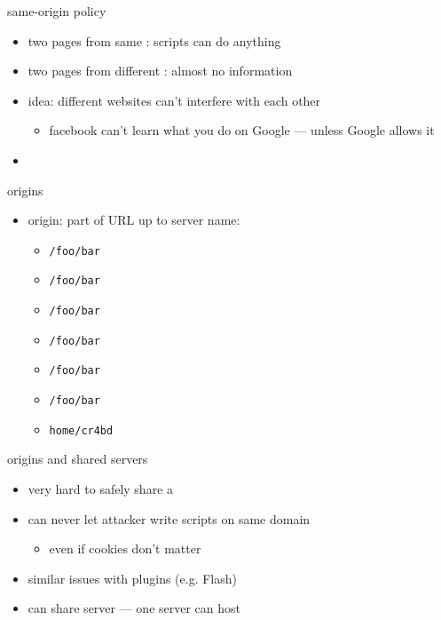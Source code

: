 \begin{frame}{same-origin policy}
    \begin{itemize}
        \item two pages from same : scripts can do anything
        \item two pages from different : almost no information
            \vspace{.5cm}
        \item idea: different websites can't interfere with each other
            \begin{itemize}
            \item facebook can't learn what you do on Google --- unless Google allows it
            \end{itemize}
        \item {}
    \end{itemize}
\end{frame}

\begin{frame}{origins}
    \begin{itemize}
        \item origin: part of URL up to server name:
            \begin{itemize}
                \item \texttt{/foo/bar}
                \item \texttt{/foo/bar}
                \item \texttt{/foo/bar}
                \item \texttt{/foo/bar}
                \item \texttt{/foo/bar}
                \item \texttt{/foo/bar}
                \item \texttt{home/cr4bd}
            \end{itemize}
    \end{itemize}
\end{frame}


\begin{frame}{origins and shared servers}
    \begin{itemize}
        \item very hard to safely share a 
    \item can never let attacker write scripts on same domain
        \begin{itemize}
        \item even if cookies don't matter
        \end{itemize}
    \item similar issues with plugins (e.g. Flash)
    \vspace{.5cm}
\item can share server --- one server can host 
    \end{itemize}
\end{frame}

